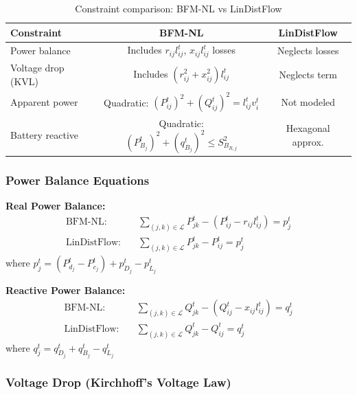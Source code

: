 \begin{table}[h]
    \centering
    \caption{Constraint comparison: BFM-NL vs LinDistFlow}
    \label{table:mpopf-constraint-comparison}
    \begin{tabular}{|l|c|c|}
    \hline
    \textbf{Constraint} & \textbf{BFM-NL} & \textbf{LinDistFlow} \\ \hline
    Power balance & Includes $r_{ij}l_{ij}^t$, $x_{ij}l_{ij}^t$ losses & Neglects losses \\ \hline
    Voltage drop (KVL) & Includes $(r_{ij}^2 + x_{ij}^2)l_{ij}^t$ & Neglects term \\ \hline
    Apparent power & Quadratic: $(P_{ij}^t)^2 + (Q_{ij}^t)^2 = l_{ij}^t v_i^t$ & Not modeled \\ \hline
    Battery reactive & Quadratic: $(P_{B_j}^t)^2 + (q_{B_j}^t)^2 \leq S_{B_{R,j}}^2$ & Hexagonal approx. \\ \hline
    \end{tabular}
\end{table}

\subsubsection{Power Balance Equations}

\textbf{Real Power Balance:}
\begin{align}
    \text{BFM-NL:} \quad &\sum_{(j, k) \in \mathcal{L}} P_{jk}^t - (P_{ij}^t - r_{ij}l_{ij}^t) = p_j^t
    \label{eq:mpopf-tradeoffs-real-nl} \\
    \text{LinDistFlow:} \quad &\sum_{(j, k) \in \mathcal{L}} P_{jk}^t - P_{ij}^t = p_j^t
    \label{eq:mpopf-tradeoffs-real-l}
\end{align}
where $p_j^t = (P_{d_j}^t - P_{c_j}^t) + p^t_{D_j} - p^t_{L_j}$

\textbf{Reactive Power Balance:}
\begin{align}
    \text{BFM-NL:} \quad &\sum_{(j, k) \in \mathcal{L}} Q_{jk}^t - (Q_{ij}^t - x_{ij}l_{ij}^t) = q_j^t
    \label{eq:mpopf-tradeoffs-reactive-nl} \\
    \text{LinDistFlow:} \quad &\sum_{(j, k) \in \mathcal{L}} Q_{jk}^t - Q_{ij}^t = q_j^t
    \label{eq:mpopf-tradeoffs-reactive-l}
\end{align}
where $q_j^t = q_{D_j}^t + q_{B_j}^t - q^t_{L_j}$

\subsubsection{Voltage Drop (Kirchhoff's Voltage Law)}

